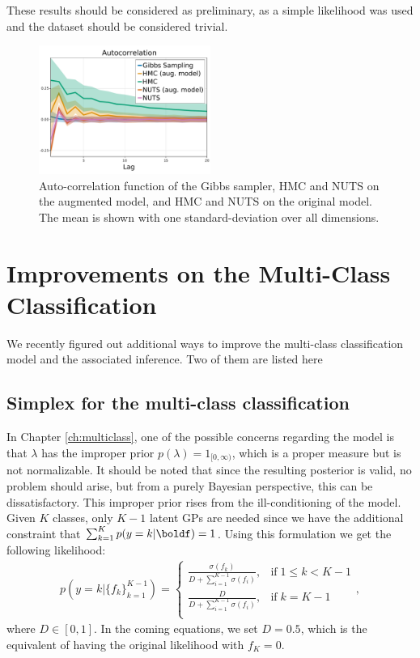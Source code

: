These results should be considered as preliminary, as a simple likelihood was used and the dataset should be considered trivial.

\begin{figure}[H]
    \centering
    \includegraphics[width=0.5\textwidth]{./chapters/8_discussions/figures/autocorrelation.pdf}
    \caption{Auto-correlation function of the Gibbs sampler, \ac{HMC} and \ac{NUTS} on the augmented model, and \ac{HMC} and \ac{NUTS} on the original model.
    The mean is shown with one standard-deviation over all dimensions.}
    \label{fig:hmc_vs_gibbs}
\end{figure}


\section{Improvements on the Multi-Class Classification}
\label{sec:improvemulticlass}
We recently figured out additional ways to improve the multi-class classification model and the associated inference.
Two of them are listed here

\subsection{Simplex for the multi-class classification}
\label{sec:simplex}
In Chapter \ref{ch:multiclass}, one of the possible concerns regarding the model is that $\lambda$ has the improper prior $p(\lambda) = 1_{[0,\infty)}$, which is a proper measure but is not normalizable.
It should be noted that since the resulting posterior is valid, no problem should arise, but from a purely Bayesian perspective, this can be dissatisfactory.
This improper prior rises from the ill-conditioning of the model.
Given $K$ classes, only $K-1$ latent \ac{GPs} are needed since we have the additional constraint that $\sum_{k=1}^K p(y=k|\boldf) = 1$.
Using this formulation we get the following likelihood:
\begin{align}
    p(y=k|\{f_k\}_{k=1}^{K-1}) = \left\{
        \begin{array}{cc}
            \frac{\sigma(f_k)}{D + \sum_{i=1}^{K-1}\sigma(f_i)}, & \mathrm{if}\; 1 \leq k < K - 1\\
            \frac{D}{D + \sum_{i=1}^{K-1}\sigma(f_i)}, & \mathrm{if}\; k = K - 1 \\
    \end{array}
    \right.,
\end{align}
where $D \in [0, 1]$.
In the coming equations, we set $D=0.5$, which is the equivalent of having the original likelihood with $f_K = 0$.

